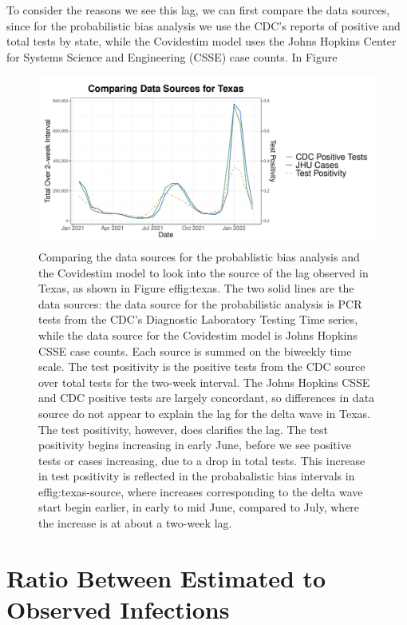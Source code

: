 \documentclass[12pt,twoside]{smiththesis}
\begin{document}
To consider the reasons we see this lag, we can first compare the data sources, since for the probabilistic bias analysis we use the CDC's reports of positive and total tests by state, while the Covidestim model uses the Johns Hopkins Center for Systems Science and Engineering (CSSE) case counts. In Figure
\begin{figure}
\includegraphics[width=1\linewidth]{figure/texas-data-sources} \caption{\label{fig:texas-source} Comparing the data sources for the probablistic bias analysis and the Covidestim model to look into the source of the lag observed in Texas, as shown in Figure ef{fig:texas}. The two solid lines are the data sources: the data source for the probabilistic analysis is PCR tests from the CDC's Diagnostic Laboratory Testing Time series, while the data source for the Covidestim model is Johns Hopkins CSSE case counts. Each source is summed on the biweekly time scale. The test positivity is the positive tests from the CDC source over total tests for the two-week interval. The Johns Hopkins CSSE and  CDC positive tests are largely concordant, so differences in data source do not appear to explain the lag for the delta wave in Texas. The test positivity, however, does clarifies the lag. The test positivity begins increasing in early June, before we see positive tests or cases increasing, due to a drop in total tests. This increase in test positivity is reflected in the probabalistic bias intervals in ef{fig:texas-source}, where increases corresponding to the delta wave start begin earlier, in early to mid June, compared to July, where the increase is at about a two-week lag.}\label{fig:unnamed-chunk-10}
\end{figure}
\hypertarget{ratio-between-estimated-to-observed-infections}{%
\section{Ratio Between Estimated to Observed Infections}\label{ratio-between-estimated-to-observed-infections}}
\end{document}

